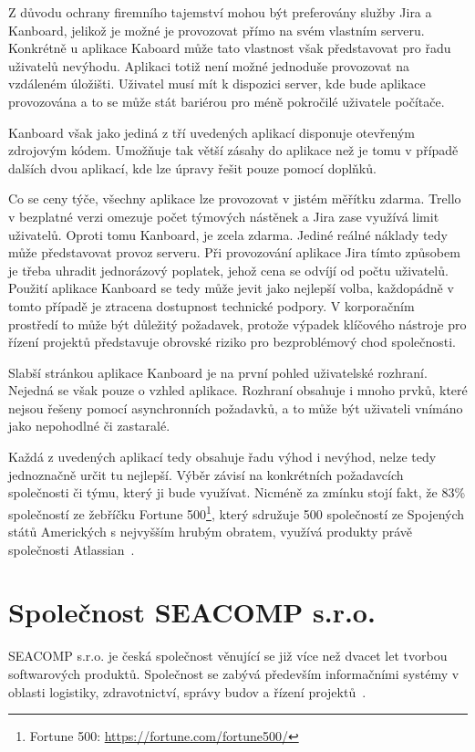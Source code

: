 Z důvodu ochrany firemního tajemství mohou být preferovány služby Jira a Kanboard, jelikož je možné je provozovat přímo na svém vlastním serveru. Konkrétně u aplikace Kaboard může tato vlastnost však představovat pro řadu uživatelů nevýhodu. Aplikaci totiž není možné jednoduše provozovat na vzdáleném úložišti. Uživatel musí mít k dispozici server, kde bude aplikace provozována a to se může stát bariérou pro méně pokročilé uživatele počítače.

Kanboard však jako jediná z tří uvedených aplikací disponuje otevřeným zdrojovým kódem. Umožňuje tak větší zásahy do aplikace než je tomu v případě dalších dvou aplikací, kde lze úpravy řešit pouze pomocí doplňků.

Co se ceny týče, všechny aplikace lze provozovat v jistém měřítku zdarma. Trello v bezplatné verzi omezuje počet týmových nástěnek a Jira zase využívá limit uživatelů. Oproti tomu Kanboard, je zcela zdarma. Jediné reálné náklady tedy může představovat provoz serveru. Při provozování aplikace Jira tímto způsobem je třeba uhradit jednorázový poplatek, jehož cena se odvíjí od počtu uživatelů. Použití aplikace Kanboard se tedy může jevit jako nejlepší volba, každopádně v tomto případě je ztracena dostupnost technické podpory. V korporačním prostředí to může být důležitý požadavek, protože výpadek klíčového nástroje pro řízení projektů představuje obrovské riziko pro bezproblémový chod společnosti.

Slabší stránkou aplikace Kanboard je na první pohled uživatelské rozhraní. Nejedná se však pouze o vzhled aplikace. Rozhraní obsahuje i mnoho prvků, které nejsou řešeny pomocí asynchronních požadavků, a to může být uživateli vnímáno jako nepohodlné či zastaralé.

Každá z uvedených aplikací tedy obsahuje řadu výhod i nevýhod, nelze tedy jednoznačně určit tu nejlepší. Výběr závisí na konkrétních požadavcích společnosti či týmu, který ji bude využívat. Nicméně za zmínku stojí fakt, že 83\% společností ze žebříčku Fortune 500\footnote{Fortune 500: \url{https://fortune.com/fortune500/}}, který sdružuje 500 společností ze Spojených států Amerických s nejvyšším hrubým obratem, využívá produkty právě společnosti Atlassian~\cite{bib:atlassian-customers}.



\section{Společnost SEACOMP s.r.o.}
SEACOMP s.r.o. je česká společnost věnující se již více než dvacet let tvorbou softwarových produktů. Společnost se zabývá především informačními systémy v oblasti logistiky, zdravotnictví, správy budov a řízení projektů~\cite{bib:seacomp-portfolio}.


